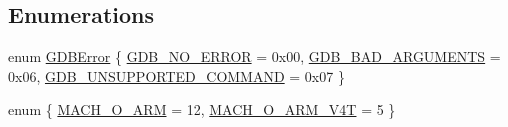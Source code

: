 \subsection*{Enumerations}
\begin{DoxyCompactItemize}
\item 
enum \mbox{\hyperlink{gdb-stub_8c_a5bd3541bce743d620bce1273a43416dd}{G\+D\+B\+Error}} \{ \mbox{\hyperlink{gdb-stub_8c_a5bd3541bce743d620bce1273a43416ddaa680a8f84a2a0a0b668ad9c008750f75}{G\+D\+B\+\_\+\+N\+O\+\_\+\+E\+R\+R\+OR}} = 0x00, 
\mbox{\hyperlink{gdb-stub_8c_a5bd3541bce743d620bce1273a43416ddaeef0423575ca7aa7140d916085a9fc84}{G\+D\+B\+\_\+\+B\+A\+D\+\_\+\+A\+R\+G\+U\+M\+E\+N\+TS}} = 0x06, 
\mbox{\hyperlink{gdb-stub_8c_a5bd3541bce743d620bce1273a43416dda58b8d55f8dc2564d163381daaae27f5a}{G\+D\+B\+\_\+\+U\+N\+S\+U\+P\+P\+O\+R\+T\+E\+D\+\_\+\+C\+O\+M\+M\+A\+ND}} = 0x07
 \}
\item 
enum \{ \mbox{\hyperlink{gdb-stub_8c_a06fc87d81c62e9abb8790b6e5713c55ba4fbf85341093edf66aa8540987b82b79}{M\+A\+C\+H\+\_\+\+O\+\_\+\+A\+RM}} = 12, 
\mbox{\hyperlink{gdb-stub_8c_a06fc87d81c62e9abb8790b6e5713c55bae0dd04ab9648730cb2eef39214f5125b}{M\+A\+C\+H\+\_\+\+O\+\_\+\+A\+R\+M\+\_\+\+V4T}} = 5
 \}
\end{DoxyCompactItemize}
